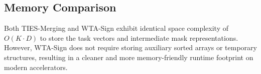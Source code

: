 \documentclass{article}
\theoremstyle{plain}
\theoremstyle{definition}
\theoremstyle{remark}
\begin{document}
\subsection{Memory Comparison}
Both TIES-Merging and WTA-Sign exhibit identical space complexity of $O(K \cdot D)$ to store the task vectors and intermediate mask representations.
However, WTA-Sign does not require storing auxiliary sorted arrays or temporary structures, resulting in a cleaner and more memory-friendly runtime footprint on modern accelerators.
\end{document}
